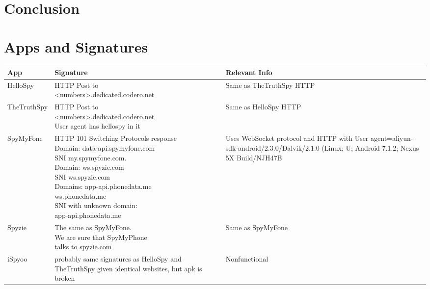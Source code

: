 \documentclass[acmtog]{acmart}
\begin{document}
\section{Conclusion}




\appendix

\section{Apps and Signatures}
\begin{table*}
\begin{tabular}{p{5cm}p{5cm}p{5cm}}
	\toprule
	App & Signature & Relevant Info \\
	\midrule
	HelloSpy & \makecell{HTTP Post to\\ <numbers>.dedicated.codero.net} & Same as TheTruthSpy HTTP \\
	
	TheTruthSpy & \makecell{HTTP Post to\\ <numbers>.dedicated.codero.net\\ User agent has hellospy in it} & Same as HelloSpy HTTP \\
	
	SpyMyFone & \makecell{HTTP 101 Switching Protocols response\\
	Domain: data-api.spymyfone.com\\SNI my.spymyfone.com.\\
	Domain: ws.spyzie.com\\SNI ws.spyzie.com\\
	Domains: app-api.phonedata.me\\ws.phonedata.me\\
	SNI with unknown domain:\\ app-api.phonedata.me} & Uses WebSocket protocol and HTTP with User agent=aliyun-sdk-android/2.3.0/Dalvik/2.1.0 (Linux; U; Android 7.1.2; Nexus 5X Build/NJH47B \\

	Spyzie & \makecell{The same as SpyMyFone.\\ We are sure that SpyMyPhone\\ talks to spyzie.com} & Same as SpyMyFone \\
	
	iSpyoo & probably same signatures as HelloSpy and TheTruthSpy given identical websites, but apk is broken & Nonfunctional \\
	

\end{tabular}
\end{table*}
\end{document}

